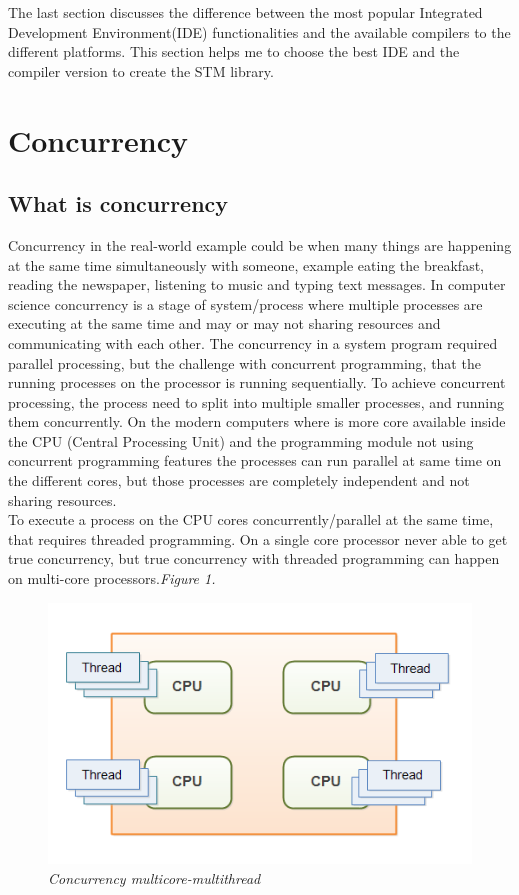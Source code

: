 \documentclass[12pt]{article}
\begin{document}
The last section discusses the difference between the most popular Integrated Development Environment(IDE) functionalities and the available compilers to the  different platforms. This section helps me to choose the best IDE and the compiler version to create the STM library.    


\section{Concurrency}
\subsection{What is concurrency}    
Concurrency in the real-world example could be when many things are happening at the same time simultaneously with someone, example eating the breakfast, reading the newspaper, listening to music and typing text messages. In computer science concurrency is a stage of system/process where multiple processes are executing at the same time and may or may not sharing resources and communicating with each other. The concurrency in a system program required parallel processing, but the challenge with concurrent programming, that the running processes on the processor is running sequentially. To achieve concurrent processing, the process need to split into multiple smaller processes, and running them concurrently. On the modern computers where is more core available inside the CPU (Central Processing Unit) and the programming module not using concurrent programming features the processes can run parallel at same time on the different cores, but those processes are completely independent and not sharing resources.\\ 

To execute a process on the CPU cores concurrently/parallel at the same time, that requires threaded programming. On a single core processor never able to get true concurrency, but true concurrency with threaded programming can happen on multi-core processors.\textit{\color{gray}Figure 1.}

\begin{figure}[h!]
\centering
\includegraphics[scale=0.5]{Pictures/Concurrency_multicore-multithreada.png}
\caption{\textit{\color{gray}Concurrency multicore-multithread \cite{Jakob}}}
\end{figure}
\end{document}
